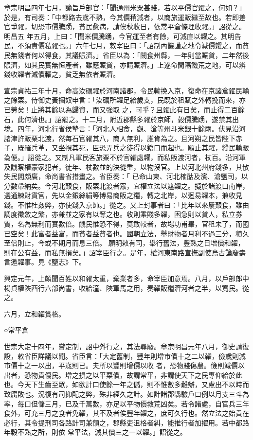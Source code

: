 \begin{pinyinscope}
 章宗明昌四年七月，諭旨戶部官：「聞通州米粟甚賤，若以平價官糴之，何如？」於是，有司奏：「中都路去歲不熟，今其價稍減者，以商旅運販繼至故也。若即差官爭糴，切恐市價騰踴，貧民愈病，請俟秋收日，依常平倉條理收糴。」詔從之。明昌五
 年五月，上曰：「聞米價騰踴，今官運至者有餘，可減直以糶之。其明告民，不須貴價私糴也。」六年七月，敕宰臣曰：「詔制內饑謹之地令減價糶之，而貧民無錢者何以得食，其議賑濟。」省臣以為：「闕食州縣，一年則當賑貸，二年然後賑濟，如其民實無恒產者，雖應賑貸，亦請賑濟。」上遂命間隔饑荒之地，可以辨錢收糴者減價糶之，貧乏無依者賑濟。



 宣宗貞祐三年十月，命高汝礪糴於河南諸郡，令民輸挽入京，復命在京諸倉糴民輸之餘粟。侍御史黃摑奴申言：「汝礪所糴足給歲支，民既於租賦之外轉挽而來，亦已勞矣！止將其餘以為歸資，而又強取
 之，可乎？且糴此有日矣，而止得二百餘石，此何濟也。」詔罷之。十二月，附近郡縣多糴於京師，穀價騰踴，遂禁其出境。四年，河北行省侯摯言：「河北人相食，觀、滄等州斗米銀十餘兩。伏見沿河諸津許販粟北渡，然每石官糴其八，商人無利，誰肯為之。且河朔之民皆陛下赤子，既罹兵革，又坐視其死，臣恐弄兵之徒得以籍口而起也。願止其糴，縱民輸販為便。」詔從之。又制凡軍民客旅粟不於官糴處糶，而私販渡河者，杖百。沿河軍及譏察權豪家犯者，徒年、杖數並的決從重，以物沒官。上以河北州府錢多，其散失民間頗廣，命尚書省措畫之。省臣奏：「
 已命山東、河北榷酤及濱、滄鹽司，以分數帶納矣。今河北艱食，販粟北渡者眾，宜權立法以遮糴之。擬於諸渡口南岸，選通練財貨官，先以金銀絲絹等博易商販之糧，轉之北岸，以迴易糴本，兼收見錢。不惟杜姦弊，亦使錢入京師。」從之。又上封事者曰：「比年以來屢艱食，雖由調度徵斂之繁，亦兼並之家有以奪之也。收則乘賤多糴，困急則以貸人，私立券質，名為無利而實數倍。饑民惟恐不得，莫敢較者，故場功甫畢，官租未了，而囤已空矣！此富者益富，而貧者益貧者也。國朝立法，舉財物者月利不過三分，積久至倍則止，今或不期月而息三倍。
 願明敕有司，舉行舊法，豐熟之日增價和糴，則在公有益，而私無損矣。」詔宰臣行之。是年，權河東南路宣撫副使烏古論慶壽言邀糴事。見《鹽志》下。



 興定元年，上頗聞百姓以和糴太重，棄業者多，命宰臣加意焉。八月，以戶部郎中楊貞權陜西行六部尚書，收給潼、陜軍馬之用，奏糴販糧濟河者之半，以寬民。從之。



 六月，立和糴賞格。



 ○常平倉



 世宗大定十四年，嘗定制，詔中外行之，其法尋廢。章宗明昌元年八月，御史請復設，敕省臣詳議以聞。省臣言：「大定舊制，豐年則增市價十之二以糴，儉歲則減市價十之一以出，平歲則已。夫所以豐則增價以收
 者，恐物賤傷農。儉則減價以出者，恐物貴傷民。增之損之以平粟價，故謂常平，非謂使天下之民專仰給於此也。今天下生齒至眾，如欲計口使餘一年之儲，則不惟數多難辦，又慮出不以時而致腐敗也。況復有司抑配之弊，殊非經久之計。如計諸郡縣驗戶口例以月支三斗為率，每口但儲三月，已及千萬數，亦足以平物價救荒凶矣。若令諸處，自官兵三年食外，可充三月之食者免糴，其不及者俟豐年糴之，庶可久行也。然立法之始貴在必行，其令提刑司各路計司兼領之，郡縣吏沮格者糾，能推行者加擢用。若中都路年穀不熟之所，則依
 常平法，減其價三之一以糴。」詔從之。




\end{pinyinscope}

